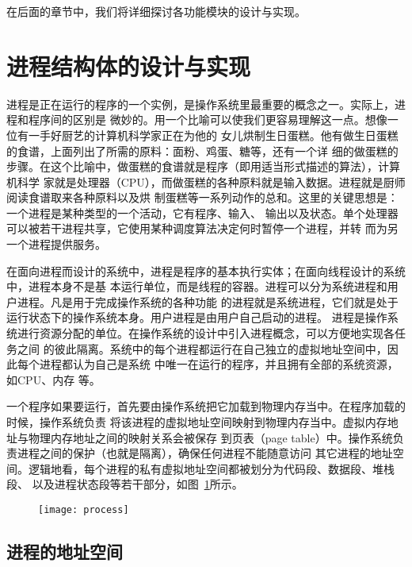 \documentclass{swfcthesismscctex}
\begin{document}
在后面的章节中，我们将详细探讨各功能模块的设计与实现。

\section{进程结构体的设计与实现}

进程是正在运行的程序的一个实例，是操作系统里最重要的概念之一。实际上，进程和程序间的区别是
微妙的。用一个比喻可以使我们更容易理解这一点。想像一位有一手好厨艺的计算机科学家正在为他的
女儿烘制生日蛋糕。他有做生日蛋糕的食谱，上面列出了所需的原料：面粉、鸡蛋、糖等，还有一个详
细的做蛋糕的步骤。在这个比喻中，做蛋糕的食谱就是程序（即用适当形式描述的算法），计算机科学
家就是处理器（CPU），而做蛋糕的各种原料就是输入数据。进程就是厨师阅读食谱取来各种原料以及烘
制蛋糕等一系列动作的总和。这里的关键思想是：一个进程是某种类型的一个活动，它有程序、输入、
输出以及状态。单个处理器可以被若干进程共享，它使用某种调度算法决定何时暂停一个进程，并转
而为另一个进程提供服务\cite{linuxjournal:process}。

在面向进程而设计的系统中，进程是程序的基本执行实体；在面向线程设计的系统中，进程本身不是基
本运行单位，而是线程的容器。进程可以分为系统进程和用户进程。凡是用于完成操作系统的各种功能
的进程就是系统进程，它们就是处于运行状态下的操作系统本身。用户进程是由用户自己启动的进程。
进程是操作系统进行资源分配的单位。在操作系统的设计中引入进程概念，可以方便地实现各任务之间
的彼此隔离。系统中的每个进程都运行在自己独立的虚拟地址空间中，因此每个进程都认为自己是系统
中唯一在运行的程序，并且拥有全部的系统资源，如CPU、内存
等\cite{Bryant2010computersystems,silberschatz11essentials}。

一个程序如果要运行，首先要由操作系统把它加载到物理内存当中。在程序加载的时候，操作系统负责
将该进程的虚拟地址空间映射到物理内存当中。虚拟内存地址与物理内存地址之间的映射关系会被保存
到页表（page table）中。操作系统负责进程之间的保护（也就是隔离），确保任何进程不能随意访问
其它进程的地址空间。逻辑地看，每个进程的私有虚拟地址空间都被划分为代码段、数据段、堆栈段、
以及进程状态段等若干部分，如图~\ref{fig:process}所示。

\begin{figure}[!htb]
  \centering
  \texttt{[image: process]}
  \label{fig:process}
\end{figure}

\subsection{进程的地址空间}\label{sec:procvm}
\end{document}
